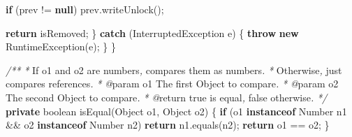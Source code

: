 \documentclass[11pt]{article}
\newenvironment{Shaded}{}{}
\newcommand{\KeywordTok}[1]{\textcolor[rgb]{0.00,0.44,0.13}{\textbf{{#1}}}}
\newcommand{\DataTypeTok}[1]{\textcolor[rgb]{0.56,0.13,0.00}{{#1}}}
\newcommand{\CommentTok}[1]{\textcolor[rgb]{0.38,0.63,0.69}{\textit{{#1}}}}
\newcommand{\FunctionTok}[1]{\textcolor[rgb]{0.02,0.16,0.49}{{#1}}}
\newcommand{\NormalTok}[1]{{#1}}
\newcommand{\ControlFlowTok}[1]{\textcolor[rgb]{0.00,0.44,0.13}{\textbf{{#1}}}}
\newcommand{\OperatorTok}[1]{\textcolor[rgb]{0.40,0.40,0.40}{{#1}}}
\newcommand{\BuiltInTok}[1]{{#1}}
\begin{document}
\begin{Shaded}
\begin{Highlighting}[]
            \ControlFlowTok{if} \OperatorTok{(}\NormalTok{prev }\OperatorTok{!=} \KeywordTok{null}\OperatorTok{)}
\NormalTok{                prev}\OperatorTok{.}\FunctionTok{writeUnlock}\OperatorTok{();}

            \ControlFlowTok{return}\NormalTok{ isRemoved}\OperatorTok{;}
        \OperatorTok{\}} \ControlFlowTok{catch} \OperatorTok{(}\BuiltInTok{InterruptedException}\NormalTok{ e}\OperatorTok{)} \OperatorTok{\{}
            \ControlFlowTok{throw} \KeywordTok{new} \BuiltInTok{RuntimeException}\OperatorTok{(}\NormalTok{e}\OperatorTok{);}
        \OperatorTok{\}}
    \OperatorTok{\}}

    \CommentTok{/**}
     \CommentTok{*}\NormalTok{ If }\CommentTok{\textasciigrave{}}\NormalTok{o1}\CommentTok{\textasciigrave{}}\NormalTok{ and }\CommentTok{\textasciigrave{}}\NormalTok{o2}\CommentTok{\textasciigrave{}}\NormalTok{ are numbers}\CommentTok{,}\NormalTok{ compares them as numbers}\CommentTok{.}
     \CommentTok{*}\NormalTok{ Otherwise}\CommentTok{,}\NormalTok{ just compares references}\CommentTok{.}
     \CommentTok{*} \CommentTok{@}\NormalTok{param o1 The first Object to compare}\CommentTok{.}
     \CommentTok{*} \CommentTok{@}\NormalTok{param o2 The second Object to compare}\CommentTok{.}
     \CommentTok{*} \CommentTok{@}\NormalTok{return }\CommentTok{\textasciigrave{}}\NormalTok{true}\CommentTok{\textasciigrave{}}\NormalTok{ is equal}\CommentTok{,} \CommentTok{\textasciigrave{}}\NormalTok{false}\CommentTok{\textasciigrave{}}\NormalTok{ otherwise}\CommentTok{.}
     \CommentTok{*/}
    \KeywordTok{private} \DataTypeTok{boolean} \FunctionTok{isEqual}\OperatorTok{(}\BuiltInTok{Object}\NormalTok{ o1}\OperatorTok{,} \BuiltInTok{Object}\NormalTok{ o2}\OperatorTok{)} \OperatorTok{\{}
        \ControlFlowTok{if} \OperatorTok{(}\NormalTok{o1 }\KeywordTok{instanceof} \BuiltInTok{Number}\NormalTok{ n1 }\OperatorTok{\&\&}\NormalTok{ o2 }\KeywordTok{instanceof} \BuiltInTok{Number}\NormalTok{ n2}\OperatorTok{)}
            \ControlFlowTok{return}\NormalTok{ n1}\OperatorTok{.}\FunctionTok{equals}\OperatorTok{(}\NormalTok{n2}\OperatorTok{);}
        \ControlFlowTok{return}\NormalTok{ o1 }\OperatorTok{==}\NormalTok{ o2}\OperatorTok{;}
    \OperatorTok{\}}


\end{Highlighting}
\end{Shaded}
\end{document}
